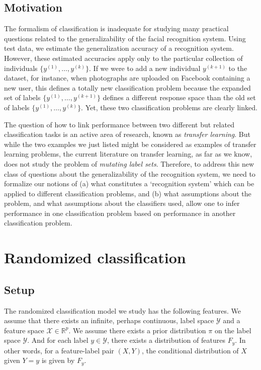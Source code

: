 \documentclass[12pt]{article}
\begin{document}
\subsection{Motivation}


The formalism of classification is inadequate for studying many
practical questions related to the generalizability of the facial
recognition system.  Using test data, we estimate the generalization
accuracy of a recognition system.  However, these estimated accuracies
apply only to the particular collection of individuals
$\{y^{(1)},\hdots, y^{(k)}\}$.  If we were to add a new individual
$y^{(k+1)}$ to the dataset, for instance, when photographs are
uploaded on Facebook containing a new user, this defines a totally new
classification problem because the expanded set of labels
$\{y^{(1)},\hdots, y^{(k+1)}\}$ defines a different response space
than the old set of labels $\{y^{(1)},\hdots, y^{(k)}\}$.  Yet, these
two classification problems are clearly linked.

The question of how to link performance between two different but
related classification tasks is an active area of research, known as
\emph{transfer learning}.  But while the two examples we just listed
might be considered as examples of transfer learning problems, the
current literature on transfer learning, as far as we know, does not
study the problem of \emph{mutating label sets}.  Therefore, to
address this new class of questions about the generalizability of the
recognition system, we need to formalize our notions of (a) what
constitutes a `recognition system' which can be applied to different
classification problems, and (b) what assumptions about the problem,
and what assumptions about the classifiers used, allow one to infer
performance in one classification problem based on performance in
another classification problem.

\section{Randomized classification}\label{sec:rc_motivation}


\subsection{Setup}

The randomized classification model we study has the following
features.  We assume that there exists an infinite, perhaps continuous, label space $\mathcal{Y}$ and a feature space $\mathcal{X} \in \mathbb{R}^p$.  
We assume there exists a prior distribution $\pi$ on the label space $\mathcal{Y}$.
And for each label $y \in \mathcal{Y}$,
there exists a distribution of features $F_y$. In other words, for a feature-label pair $(X, Y)$, the conditional distribution
of $X$ given $Y = y$ is given by $F_y$.  
\end{document}

